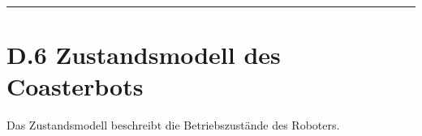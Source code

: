 \documentclass[
  a4paper,
  12pt,
  DIV=12,        %
  parskip=half,  %
  headings=small %
]{scrartcl}
\theoremstyle{definition}
\theoremstyle{definition}
\newenvironment{Shaded}{\begin{snugshade}}{\end{snugshade}}
\begin{document}
\begin{center}\rule{0.5\linewidth}{0.5pt}\end{center}

\section{D.6 Zustandsmodell des
Coasterbots}\label{d.6-zustandsmodell-des-coasterbots}

Das Zustandsmodell beschreibt die Betriebszustände des Roboters.


\end{document}
